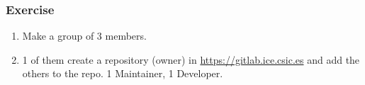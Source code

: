 \begin{frame}

\frametitle{Exercise}

\begin{enumerate}[<+->]
\item Make a group of 3 members.
\item 1 of them create a repository (owner) in \href{Gitlab}{https://gitlab.ice.csic.es} and add the others to the repo. 1 Maintainer, 1 Developer.

\end{enumerate}
\end{frame}